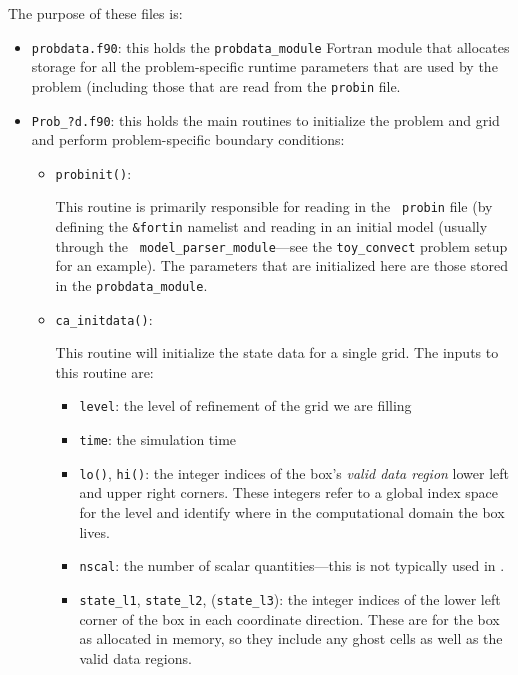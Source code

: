 The purpose of these files is:
\begin{itemize}
\item {\tt probdata.f90}: this holds the {\tt probdata\_module} Fortran module
  that allocates storage for all the problem-specific runtime parameters that
  are used by the problem (including those that are read from the {\tt probin}
  file.

\item {\tt Prob\_?d.f90}: this holds the main routines to
  initialize the problem and grid and perform problem-specific boundary
  conditions:

  \begin{itemize}
  \item {\tt probinit()}:

    This routine is primarily responsible for reading in the {\tt
      probin} file (by defining the {\tt \&fortin} namelist and
    reading in an initial model (usually through the {\tt
      model\_parser\_module}---see the {\tt toy\_convect} problem
    setup for an example).  The parameters that are initialized
    here are those stored in the {\tt probdata\_module}.

  \item {\tt ca\_initdata()}:

    This routine will initialize the state data for a single grid.
    The inputs to this routine are:
    \begin{itemize}
    \item {\tt level}: the level of refinement of the grid we are filling

    \item {\tt time}: the simulation time

    \item {\tt lo()}, {\tt hi()}: the integer indices of the box's {\em
      valid data region} lower left and upper right corners.  These
      integers refer to a global index space for the level and
      identify where in the computational domain the box lives.

    \item {\tt nscal}: the number of scalar quantities---this is not typically
      used in \castro.

    \item {\tt state\_l1}, {\tt state\_l2}, ({\tt state\_l3}): the
      integer indices of the lower left corner of the box in each
      coordinate direction.  These are for the box as allocated in memory,
      so they include any ghost cells as well as the valid data regions.


\end{itemize}
\end{itemize}
\end{itemize}
